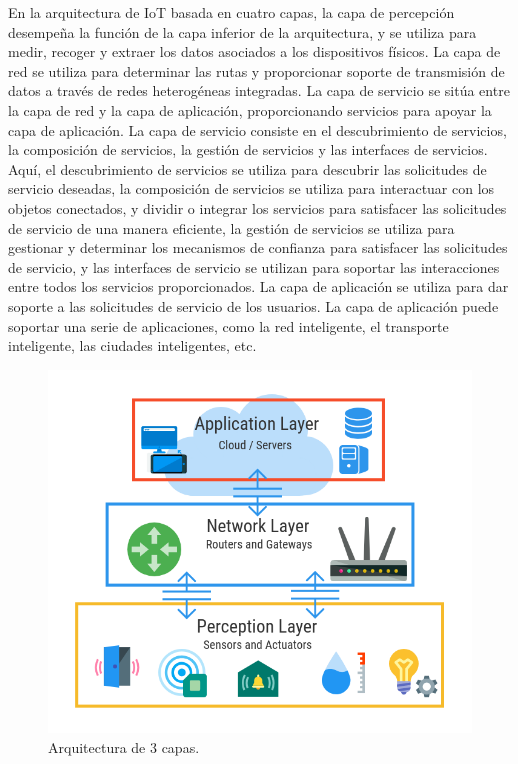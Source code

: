 {En la arquitectura de IoT basada en cuatro capas, la capa de percepción desempeña la función de la capa inferior de la arquitectura, y se utiliza para medir, recoger y extraer los datos asociados a los dispositivos físicos. La capa de red se utiliza para determinar las rutas y proporcionar soporte de transmisión de datos a través de redes heterogéneas integradas. La capa de servicio se sitúa entre la capa de red y la capa de aplicación, proporcionando servicios para apoyar la capa de aplicación. La capa de servicio consiste en el descubrimiento de servicios, la composición de servicios, la gestión de servicios y las interfaces de servicios. Aquí, el descubrimiento de servicios se utiliza para descubrir las solicitudes de servicio deseadas, la composición de servicios se utiliza para interactuar con los objetos conectados, y dividir o integrar los servicios para satisfacer las solicitudes de servicio de una manera eficiente, la gestión de servicios se utiliza para gestionar y determinar los mecanismos de confianza para satisfacer las solicitudes de servicio, y las interfaces de servicio se utilizan para soportar las interacciones entre todos los servicios proporcionados. La capa de aplicación se utiliza para dar soporte a las solicitudes de servicio de los usuarios. La capa de aplicación puede soportar una serie de aplicaciones, como la red inteligente, el transporte inteligente, las ciudades inteligentes, etc. \cite{lin2017survey}

\begin{figure}[hb!]
    \centering
    \includegraphics[width=\linewidth]{imagenes/arch-3-layer.png}
    \caption{Arquitectura de 3 capas. \cite{fig-3-layer-arch}}
    \label{fig:figure1}
\end{figure}

}
